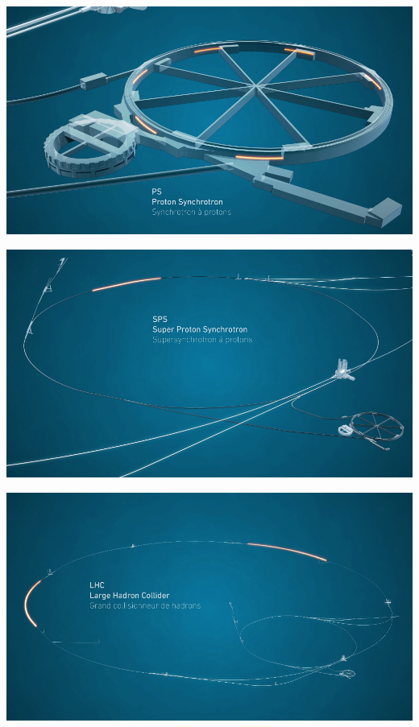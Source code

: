 \documentclass{beamer}
\begin{document}
\begin{frame}
    \includegraphics[width=\textwidth]{video/ps.png}
\end{frame}

\begin{frame}
    \includegraphics[width=\textwidth]{video/sps.png}
\end{frame}

\begin{frame}
    \includegraphics[width=\textwidth]{video/lhc.png}
\end{frame}
\end{document}
